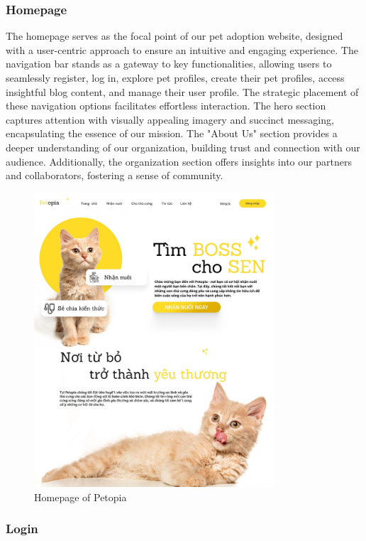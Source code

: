 \subsubsection{Homepage}

The homepage serves as the focal point of our pet adoption website, designed with a user-centric approach to ensure an intuitive and engaging experience. The navigation bar stands as a gateway to key functionalities, allowing users to seamlessly register, log in, explore pet profiles, create their pet profiles, access insightful blog content, and manage their user profile. The strategic placement of these navigation options facilitates effortless interaction. The hero section captures attention with visually appealing imagery and succinct messaging, encapsulating the essence of our mission. The "About Us" section provides a deeper understanding of our organization, building trust and connection with our audience. Additionally, the organization section offers insights into our partners and collaborators, fostering a sense of community.

\begin {figure}[H]
\centering
\includegraphics[width=0.8\textwidth]{Figures/home_ui.jpg}
\caption{Homepage of Petopia}
\end{figure}

\subsubsection{Login}

